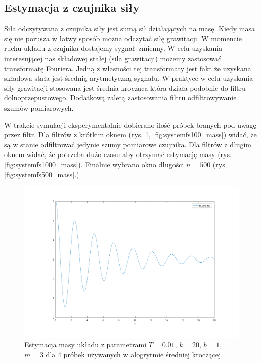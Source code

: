 \documentclass[a4paper]{article}
\begin{document}
\subsection{Estymacja z czujnika siły}
\label{fs}
Siła odczytywana z czujnika siły jest sumą sił działających na masę. Kiedy masa się nie porusza w łatwy sposób można odczytać siłę grawitacji. W momencie ruchu układu z czujnika dostajemy sygnał zmienny. W celu uzyskania interesującej nas składowej stałej (siła grawitacji) możemy zastosować transformatę Fouriera. Jedną z własności tej transformaty jest fakt że uzyskana składowa stała jest średnią arytmetyczną sygnału. W praktyce w celu uzyskania siły grawitacji stosowana jest średnia krocząca która działa podobnie do filtru dolnoprzepustowego. Dodatkową zaletą zastosowania filtru odfiltrowywanie szumów pomiarowych.

W trakcie symulacji eksperymentalnie dobierano ilość próbek branych pod uwagę przez filtr. Dla filtrów z krótkim oknem (rys. \ref{fig:systemfs4_mass}, \ref{fig:systemfs100_mass}) widać, że są w stanie odfiltrować jedynie szumy pomiarowe czujnika. Dla filtrów z długim oknem widać, że potrzeba dużo czasu aby otrzymać estymację masy (rys. \ref{fig:systemfs1000_mass}). Finalnie wybrano okno długości $n = 500$ (rys. \ref{fig:systemfs500_mass}.)

\begin{figure}[H]
	\includegraphics[width=0.99\linewidth]{systemfs4_mass}
	\centering
	\caption{Estymacja masy układu z parametrami $T=0.01$, $k = 20$, $b = 1$, $m = 3$ dla 4 próbek używanych w alogrytmie średniej kroczącej. }
	\label{fig:systemfs4_mass}
\end{figure}
\end{document}
